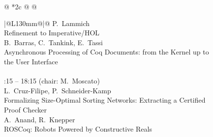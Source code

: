 \documentclass[11pt]{report}
\begin{document}
\begin{figure}[p]
\begin{center}
{\begin{tabular}[t]{@{} *{2}{c @{\hspace{4mm}}} @{}}
\begin{tabular}[t]{|@{\hspace{0.5mm}}L{130mm}@{\hspace{0.5mm}}|@{}}
   P.~Lammich\\
   Refinement to Imperative/HOL\smallskip\\
   B.~Barras, C.~Tankink, E.~Tassi\\ 
   Asynchronous Processing of Coq Documents: 
   from the Kernel up to the User Interface\\
   \hline
   \\
   :15 -- 18:15 (chair: M.~Moscato)\smallskip\\
   L.~Cruz-Filipe, P.~Schneider-Kamp\\
   Formalizing Size-Optimal Sorting Networks: Extracting a 
   Certified Proof Checker\smallskip\\
   A.~Anand, R.~Knepper\\ 
   ROSCoq: Robots Powered by Constructive Reals\\
   \hline
   \end{tabular} 
\end{tabular}}
\end{center}
\end{figure}
\end{document}

